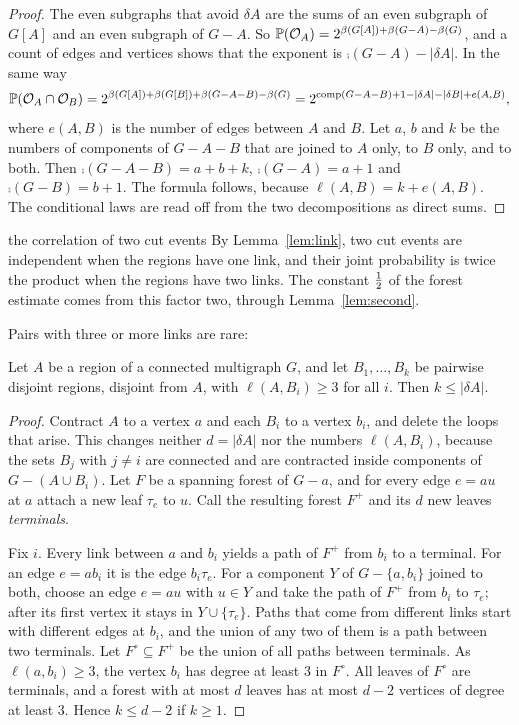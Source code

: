 \begin{proof}
The even subgraphs that avoid $\delta A$ are the sums of an even subgraph of $G[A]$ and an even
subgraph of $G-A$. So $\mathbb{P}(\mathcal{O}_A)=2^{\beta(G[A])+\beta(G-A)-\beta(G)}$, and a count of edges and
vertices shows that the exponent is $\comp(G-A)-|\delta A|$. In the same way
\[
  \mathbb{P}(\mathcal{O}_A\cap\mathcal{O}_B)=2^{\beta(G[A])+\beta(G[B])+\beta(G-A-B)-\beta(G)}
     =2^{\operatorname{comp}(G-A-B)+1-|\delta A|-|\delta B|+e(A,B)},
\]
where $e(A,B)$ is the number of edges between $A$ and $B$. Let $a$, $b$ and $k$ be the numbers of
components of $G-A-B$ that are joined to $A$ only, to $B$ only, and to both. Then
$\comp(G-A-B)=a+b+k$, $\comp(G-A)=a+1$ and $\comp(G-B)=b+1$. The formula follows, because
$\ell(A,B)=k+e(A,B)$. The conditional laws are read off from the two decompositions as direct sums.
\end{proof}

\begin{idea}{the correlation of two cut events}
By Lemma~\ref{lem:link}, two cut events are independent when the regions have one link, and
their joint probability is twice the product when the regions have two links. The constant
$\tfrac12$ of the forest estimate comes from this factor two, through Lemma~\ref{lem:second}.
\end{idea}

Pairs with three or more links are rare:

\begin{lemma}\label{lem:exc}
Let $A$ be a region of a connected multigraph $G$, and let $B_1,\dots,B_k$ be pairwise disjoint
regions, disjoint from $A$, with $\ell(A,B_i)\ge3$ for all $i$. Then $k\le|\delta A|$.
\end{lemma}

\begin{proof}
Contract $A$ to a vertex $a$ and each $B_i$ to a vertex $b_i$, and delete the loops that arise.
This changes neither $d=|\delta A|$ nor the numbers $\ell(A,B_i)$, because the sets $B_j$ with
$j\ne i$ are connected and are contracted inside components of $G-(A\cup B_i)$. Let $F$ be a
spanning forest of $G-a$, and for every edge $e=au$ at $a$ attach a new leaf $\tau_e$ to $u$. Call
the resulting forest $F^{+}$ and its $d$ new leaves \emph{terminals}.

Fix $i$. Every link between $a$ and $b_i$ yields a path of $F^{+}$ from $b_i$ to a terminal. For an
edge $e=ab_i$ it is the edge $b_i\tau_e$. For a component $Y$ of $G-\{a,b_i\}$ joined to both,
choose an edge $e=au$ with $u\in Y$ and take the path of $F^{+}$ from $b_i$ to $\tau_e$; after its
first vertex it stays in $Y\cup\{\tau_e\}$. Paths that come from different links start with
different edges at $b_i$, and the union of any two of them is a path between two terminals. Let
$F^{\circ}\subseteq F^{+}$ be the union of all paths between terminals. As $\ell(a,b_i)\ge3$, the
vertex $b_i$ has degree at least $3$ in $F^{\circ}$. All leaves of $F^{\circ}$ are terminals, and a
forest with at most $d$ leaves has at most $d-2$ vertices of degree at least $3$. Hence $k\le d-2$
if $k\ge1$.
\end{proof}

